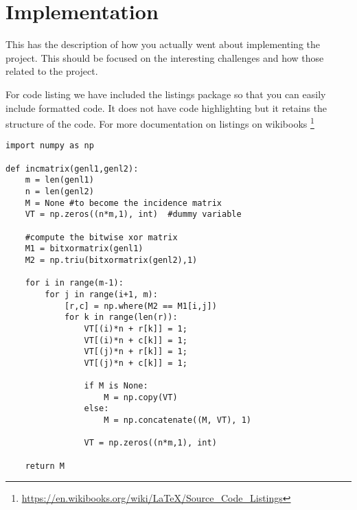 \chapter{Implementation}
\label{chap:implementation}
This has the description of how you actually went about implementing the project.  This should be focused on the interesting challenges and how those related to the project.



For code listing we have included the listings package so that you can easily include formatted code.  It does not have code highlighting but it retains the structure of the code.  For more documentation on listings on wikibooks \footnote{\url{https://en.wikibooks.org/wiki/LaTeX/Source_Code_Listings}}

\lstset{language=Python}
\begin{lstlisting}
import numpy as np
 
def incmatrix(genl1,genl2):
    m = len(genl1)
    n = len(genl2)
    M = None #to become the incidence matrix
    VT = np.zeros((n*m,1), int)  #dummy variable
 
    #compute the bitwise xor matrix
    M1 = bitxormatrix(genl1)
    M2 = np.triu(bitxormatrix(genl2),1) 
 
    for i in range(m-1):
        for j in range(i+1, m):
            [r,c] = np.where(M2 == M1[i,j])
            for k in range(len(r)):
                VT[(i)*n + r[k]] = 1;
                VT[(i)*n + c[k]] = 1;
                VT[(j)*n + r[k]] = 1;
                VT[(j)*n + c[k]] = 1;
 
                if M is None:
                    M = np.copy(VT)
                else:
                    M = np.concatenate((M, VT), 1)
 
                VT = np.zeros((n*m,1), int)
 
    return M
\end{lstlisting}



